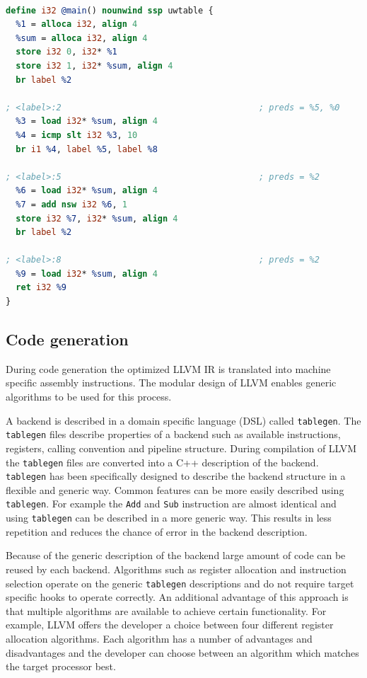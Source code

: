 \lstset{numbers=none, captionpos=b}
\begin{lstlisting}[language=llvm,caption={LLVM Intermediate representation},label=lst:LLVM_IR]

define i32 @main() nounwind ssp uwtable {
  %1 = alloca i32, align 4
  %sum = alloca i32, align 4
  store i32 0, i32* %1
  store i32 1, i32* %sum, align 4
  br label %2

; <label>:2                                       ; preds = %5, %0
  %3 = load i32* %sum, align 4
  %4 = icmp slt i32 %3, 10
  br i1 %4, label %5, label %8

; <label>:5                                       ; preds = %2
  %6 = load i32* %sum, align 4
  %7 = add nsw i32 %6, 1
  store i32 %7, i32* %sum, align 4
  br label %2

; <label>:8                                       ; preds = %2
  %9 = load i32* %sum, align 4
  ret i32 %9
}

\end{lstlisting}

\subsection{Code generation}
During code generation the optimized LLVM IR is translated into machine specific assembly instructions. The modular design of LLVM enables generic algorithms to be used for this process. 

A backend is described in a domain specific language (DSL) called \texttt{tablegen}. The \texttt{tablegen} files describe properties of a backend such as available instructions, registers, calling convention and pipeline structure. During compilation of LLVM the \texttt{tablegen} files are converted into a C++ description of the backend. \texttt{tablegen} has been specifically designed to describe the backend structure in a flexible and generic way. Common features can be more easily described using \texttt{tablegen}. For example the \texttt{Add} and \texttt{Sub} instruction are almost identical and using \texttt{tablegen} can be described in a more generic way. This results in less repetition and reduces the chance of error in the backend description.

Because of the generic description of the backend large amount of code can be reused by each backend. Algorithms such as register allocation and instruction selection operate on the generic \texttt{tablegen} descriptions and do not require target specific hooks to operate correctly. An additional advantage of this approach is that multiple algorithms are available to achieve certain functionality. For example, LLVM offers the developer a choice between four different register allocation algorithms. Each algorithm has a number of advantages and disadvantages and the developer can choose between an algorithm which matches the target processor best.

